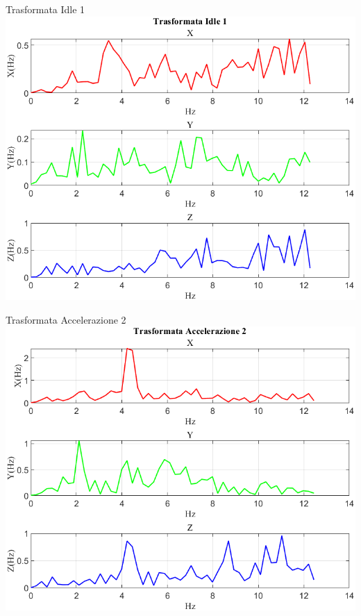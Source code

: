 \documentclass[beamer]{standalone}
\begin{document}
	\begin{frame}{{Trasformata Idle 1}}
		\centering\includegraphics[height=.8\textheight]{figure/Acc/Trasformata/Trasformata Idle 1}
	\end{frame}
	
	\begin{frame}{{Trasformata Accelerazione 2}}
		\centering\includegraphics[height=.8\textheight]{figure/Acc/Trasformata/Trasformata Accelerazione 2}
	\end{frame}
	
\end{document}
